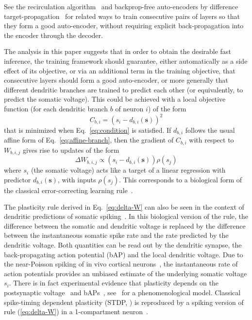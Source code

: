 \documentclass{article}
\newcommand   \vs{{\bm s}}
\begin{document}
See the recirculation algorithm~\citep{Hinton+McClelland-NIPS1987}
and backprop-free auto-encoders by difference target-propagation~\citep{Lee+Bengio-NIPSDL2014-small,Lee-et-al-MLKDB2015-small}
for related ways to train consecutive pairs of layers so that they form a good auto-encoder,
without requiring explicit back-propagation into the encoder through the decoder.

The analysis in this paper suggests that in order to obtain the desirable
fast inference, the training framework should guarantee, either automatically
as a side effect of its objective, or via an additional term in the training objective,
that consecutive layers should form a good auto-encoder, or more generally that
different dendritic branches are trained to predict each other (or equivalently,
to predict the somatic voltage). This could be achieved with a local
objective function (for each dendritic branch $b$ of neuron $i$) of the form
\begin{equation}
     C_{b,i} = (s_i - d_{b,i}(\vs))^2
\end{equation}
that is minimized when Eq.~\ref{eq:condition} is satisfied. If $d_{b,i}$
follows the usual affine form of Eq.~\ref{eq:affine-branch}, then
the gradient of $C_{b,i}$ with respect to $W_{b,i,j}$ gives rise
to updates of the form
\begin{equation}
  \label{eq:delta-W}
   \Delta W_{b,i,j} \propto (s_i - d_{b,i}(\vs)) \rho(s_j)
\end{equation}
where $s_i$ (the somatic voltage) acts like a target of a linear
regression with predictor $d_{b,i}(\vs)$, with inputs $\rho(s_j)$.
This corresponds to a biological form of the classical error-correcting learning rule~\citep{Widrow62}. 

The plasticity rule derived in Eq.~\ref{eq:delta-W} can also be seen in the context of dendritic predictions of somatic spiking~\citep{Urbanczik+Senn-2014}. In this biological version of the rule, the difference between the somatic and dendritic voltage is replaced by the difference between the instantaneous somatic spike rate and the rate predicted by the dendritic voltage. Both quantities can be read out by the dendritic synapse, the back-propagating action potential (bAP) and the local dendritic voltage.  Due to the near-Poisson
spiking of in vivo cortical neurons~\citep{Shadlen1998}, the instantaneous rate of action potentials
provides an unbiased estimate of the underlying somatic voltage $s_i$. There is in fact experimental evidence that plasticity depends on the postsynaptic voltage~\citep{Artola1990,Sjostrom2001} and bAPs~\citep{Markram1997}, see~\citep{Clopath2010} for a phenomenological model. Classical spike-timing dependent plasticity (STDP, \citet{Markram1997}) is reproduced by a spiking version of rule (\ref{eq:delta-W}) in a 1-compartment neuron~\citep{Brea2013}.
\end{document}
